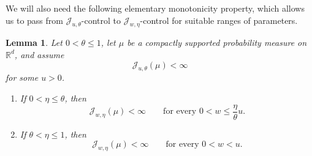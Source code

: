 \documentclass[11pt]{amsart}
\numberwithin{equation}{section}
\renewcommand{\le}{\leqslant}
\newcommand{\J}{\mathcal{J}}
\newtheorem{lemma}[theorem]{Lemma}
\theoremstyle{plain}
\theoremstyle{remark}
\newcommand{\Rd}{\mathbb{R}^d}
\begin{document}
We will also need the following elementary monotonicity property, which allows us to pass from \(\J_{u,\theta}\)-control to \(\J_{w,\eta}\)-control for suitable ranges of parameters.
\begin{lemma}\label{lem:Jtheta-to-Jeta}
Let \(0<\theta\le 1\), let \(\mu\) be a compactly supported probability measure on $\Rd$, and assume
\[
\J_{u,\theta}(\mu)<\infty
\]
for some \(u>0\).

\begin{enumerate}
\item If \(0<\eta\le \theta\), then
\[
\J_{w,\eta}(\mu)<\infty
\qquad\text{for every } 0<w\le \frac{\eta}{\theta}u.
\]

\item If \(\theta<\eta\le 1\), then
\[
\J_{w,\eta}(\mu)<\infty
\qquad\text{for every } 0<w<u.
\]
\end{enumerate}
\end{lemma}
\end{document}
